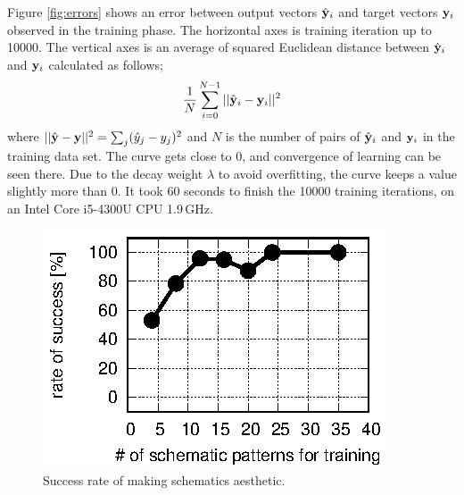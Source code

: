 \documentclass[twocolumn]{article}
\begin{document}
Figure \ref{fig:errors} shows an error
between output vectors $\hat{\bf y}_i$ and target vectors ${\bf y}_i$
observed in the training phase.
The horizontal axes is training iteration up to 10000.
The vertical axes is an average of squared Euclidean distance between
$\hat{\bf y}_i$ and ${\bf y}_i$ calculated as follows;
\begin{eqnarray}
\frac{1}{N}\sum_{i=0}^{N-1}||\hat{\bf y}_i - {\bf y}_i||^2
\end{eqnarray}
where $||\hat{\bf y} - {\bf y}||^2 = \sum_j(\hat{y}_j - y_j)^2$
and $N$ is the number of pairs of $\hat{\bf y}_i$ and ${\bf y}_i$
in the training data set.
The curve gets close to 0, and convergence of learning can be seen there.
Due to the decay weight $\lambda$ to avoid overfitting,
the curve keeps a value slightly more than 0.
It took 60 seconds to finish the 10000 training iterations,
on an Intel Core i5-4300U CPU 1.9\,GHz.

\begin{figure}[!tp]
 \begin{center}
  \begin{minipage}{\hsize}
   \includegraphics[width=\hsize]{fig/test_data.eps}
   \caption{Success rate of making schematics aesthetic.}
   \label{fig:test_data}
  \end{minipage}
 \end{center}
\end{figure}
\end{document}
